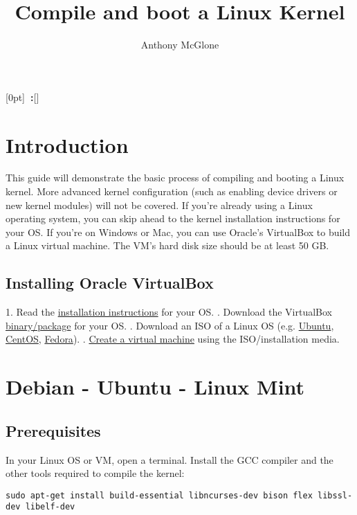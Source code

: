 \documentclass[12pt,a4paper]{report}
\author{Anthony McGlone}\title{Compile and boot a Linux Kernel}
\newcommand{\setupname}[1][\chaptername]{
\titlecontents{chapter}[0pt]{\vspace{1ex}}{\bfseries#1~\thecontentslabel:\quad}{\bfseries}{\bfseries\hfill\contentspage}[]
}
\begin{document}
\maketitle

\tableofcontents

\setupname
\chapter{Introduction}

This guide will demonstrate the basic process of compiling and booting a Linux kernel. More advanced kernel configuration (such as enabling device drivers or new kernel modules) will not be covered. 
\newline
\newline
If you're already using a Linux operating system, you can skip ahead to the kernel installation instructions for your OS. 
\newline
\newline
If you're on Windows or Mac, you can use Oracle's VirtualBox to build a Linux virtual machine. The VM's hard disk size should be at least 50 GB.

\section{Installing Oracle VirtualBox}

1. Read the \href{https://www.virtualbox.org/manual/ch02.html}{installation instructions} for your OS.
. Download the VirtualBox \href{https://www.virtualbox.org/wiki/Downloads}{binary/package} for your OS.
. Download an ISO of a Linux OS (e.g. \href{https://ubuntu.com/download/desktop}{Ubuntu}, \href{https://www.centos.org/download/}{CentOS}, \href{https://getfedora.org/workstation/download/}{Fedora}).
. \href{https://docs.oracle.com/cd/E26217_01/E26796/html/qs-create-vm.html}{Create a virtual machine} using the ISO/installation media.



\chapter{Debian - Ubuntu - Linux Mint}

\section{Prerequisites}
In your Linux OS or VM, open a terminal. Install the GCC compiler and the other tools required to compile the kernel:
\newline
\newline
\centerline{\texttt{\scriptsize sudo apt-get install build-essential libncurses-dev bison flex libssl-dev libelf-dev}}
\end{document}
